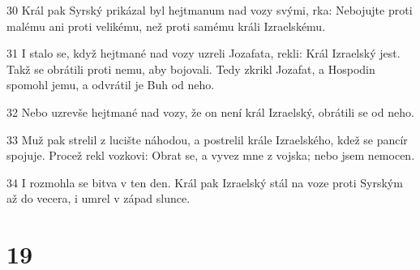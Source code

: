 \par 30 Král pak Syrský prikázal byl hejtmanum nad vozy svými, rka: Nebojujte proti malému ani proti velikému, než proti samému králi Izraelskému.
\par 31 I stalo se, když hejtmané nad vozy uzreli Jozafata, rekli: Král Izraelský jest. Takž se obrátili proti nemu, aby bojovali. Tedy zkrikl Jozafat, a Hospodin spomohl jemu, a odvrátil je Buh od neho.
\par 32 Nebo uzrevše hejtmané nad vozy, že on není král Izraelský, obrátili se od neho.
\par 33 Muž pak strelil z lucište náhodou, a postrelil krále Izraelského, kdež se pancír spojuje. Procež rekl vozkovi: Obrat se, a vyvez mne z vojska; nebo jsem nemocen.
\par 34 I rozmohla se bitva v ten den. Král pak Izraelský stál na voze proti Syrským až do vecera, i umrel v západ slunce.

\chapter{19}

